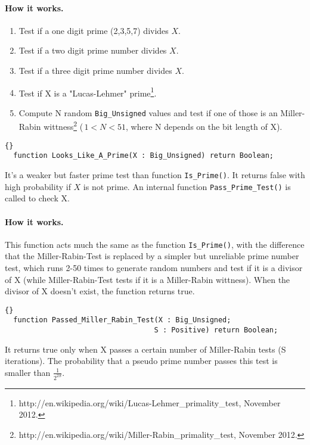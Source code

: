 \paragraph{How it  works.}
\begin{enumerate}
\item Test if a one digit prime (2,3,5,7) divides $X$.
\item Test if a two digit prime number divides $X$.
\item Test if a three digit prime number divides $X$.
\item Test if X is a "Lucas-Lehmer" prime\footnote{http://en.wikipedia.org/wiki/Lucas-Lehmer\_primality\_test, November 2012.}.
\item Compute N random \texttt{Big\_Unsigned} values and test if one
  of those is an Miller-Rabin
  wittness\footnote{http://en.wikipedia.org/wiki/Miller-Rabin\_primality\_test,
    November 2012.} ($\,1<N<51$, where N depends on the bit length of X).
\end{enumerate}

\hhline
\begin{lstlisting}{}
  function Looks_Like_A_Prime(X : Big_Unsigned) return Boolean;
\end{lstlisting}
It's a weaker but faster prime test than function
\texttt{Is\_Prime()}. It returns false with high probability if $X$ is
not prime. An internal function \texttt{Pass\_Prime\_Test()} is called
to check X.

\paragraph{How it works.} This function acts much the same as the
function \texttt{Is\_Prime()}, with the difference that the
Miller-Rabin-Test is replaced by a simpler but unreliable prime number
test, which runs 2-50 times to generate random numbers and test if it
is a divisor of X (while Miller-Rabin-Test tests if it is a
Miller-Rabin wittness). When the divisor of X doesn't exist, the
function returns true.

\hhline
\begin{lstlisting}{}
  function Passed_Miller_Rabin_Test(X : Big_Unsigned;
                                   S : Positive) return Boolean;
\end{lstlisting}
It returns true only when X passes a certain number of Miller-Rabin
tests (S iterations). The probability that a pseudo prime number
passes this test is smaller than $\frac{1}{2^{2S}}$.


